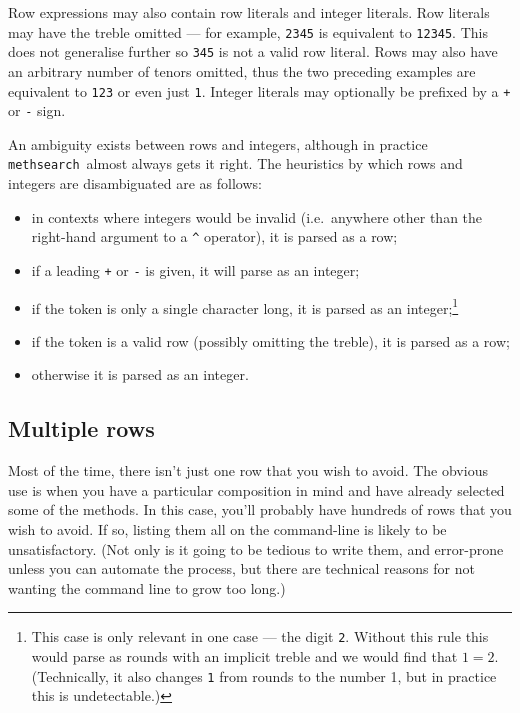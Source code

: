 \documentclass[a4paper,11pt,oneside]{book}
\def\methsearch{\texttt{meth\-search}}
\begin{document}
Row expressions may also contain row literals and integer literals.
Row literals may have the treble omitted --- for example,
\verb+2345+ is equivalent to \verb+12345+.  This does not generalise
further so \verb+345+ is not a valid row literal.  Rows may also have 
an arbitrary number of tenors omitted, thus the two preceding examples
are equivalent to \verb+123+ or even just \verb+1+.  
Integer literals may optionally be prefixed by a \verb-+- or \verb+-+ sign.

An ambiguity exists between rows and integers, although in practice
\methsearch\ almost always gets it right.  The heuristics by which rows
and integers are disambiguated are as follows:
\begin{itemize}\renewcommand{\labelitemi}{---}
\item in contexts where integers would be invalid (i.e.\ anywhere other
than the right-hand argument to a \verb+^+ operator), it is parsed as a row;
\item if a leading \verb-+- or \verb+-+ is given, it will parse as an integer;
\item if the token is only a single character long, it is parsed as an 
integer;\footnote{This case is only relevant in one case --- the digit 
\verb+2+.  Without this rule this would parse as rounds with an implicit 
treble and we would find that $1 = 2$.  (Technically, it also changes \verb+1+
from rounds to the number 1, but in practice this is undetectable.)}
\item if the token is a valid row (possibly omitting the treble), it is 
parsed as a row;
\item otherwise it is parsed as an integer.
\end{itemize}

\subsection{Multiple rows}\label{rowexprmulti}

Most of the time, there isn't just one row that you wish to avoid.
The obvious use is when you have a particular composition in mind and have
already selected some of the methods.  In this case, you'll probably have
hundreds of rows that you wish to avoid.
If so, listing them all on the command-line is likely to be unsatisfactory.
(Not only is it going to be tedious to write them, and error-prone unless
you can automate the process, but there are technical reasons for not
wanting the command line to grow too long.)
\end{document}
